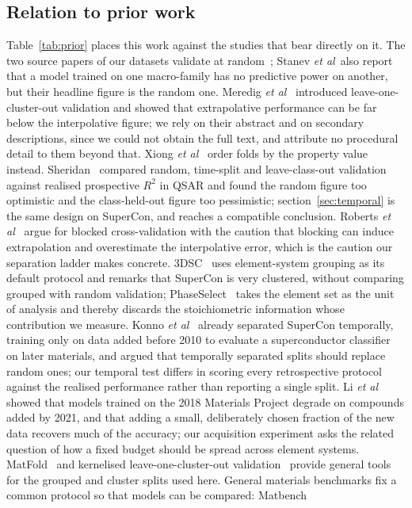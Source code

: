 \documentclass{iopjournal}
\newcommand{\Rsq}{R^{2}}
\newcommand{\etal}{\textit{et al}}
\begin{document}
\subsection{Relation to prior work}
\label{sec:prior}

Table~\ref{tab:prior} places this work against the studies that bear directly on it. The two source
papers of our datasets validate at random~\cite{hamidieh2018,stanev2018}; Stanev \etal\ also report
that a model trained on one macro-family has no predictive power on another, but their headline
figure is the random one. Meredig \etal~\cite{meredig2018} introduced leave-one-cluster-out
validation and showed that extrapolative performance can be far below the interpolative figure; we
rely on their abstract and on secondary descriptions, since we could not obtain the full text, and
attribute no procedural detail to them beyond that. Xiong \etal~\cite{xiong2020} order folds by
the property value instead. Sheridan~\cite{sheridan2013} compared random, time-split and
leave-class-out validation against realised prospective $\Rsq$ in QSAR and found the random figure
too optimistic and the class-held-out figure too pessimistic; section~\ref{sec:temporal} is the
same design on SuperCon, and reaches a compatible conclusion. Roberts \etal~\cite{roberts2017}
argue for blocked cross-validation with the caution that blocking can induce extrapolation and
overestimate the interpolative error, which is the caution our separation ladder makes concrete.
3DSC~\cite{sommer2023} uses element-system grouping as its default protocol and remarks that
SuperCon is very clustered, without comparing grouped with random validation;
PhaseSelect~\cite{vasylenko2023} takes the element set as the unit of analysis and thereby discards
the stoichiometric information whose contribution we measure. Konno \etal~\cite{konno2021} already separated SuperCon temporally, training only on data added before 2010 to evaluate a superconductor classifier on later materials, and argued that temporally separated splits should replace random ones; our temporal test differs in scoring every retrospective protocol against the realised performance rather than reporting a single split. Li \etal~\cite{li2023} showed that models trained on the 2018 Materials Project degrade on compounds added by 2021, and that adding a small, deliberately chosen fraction of the new data recovers much of the accuracy; our acquisition experiment asks the related question of how a fixed budget should be spread across element systems. MatFold~\cite{witman2025} and kernelised leave-one-cluster-out validation~\cite{durdy2022} provide general tools for the grouped and cluster splits used here. General materials benchmarks fix a common protocol so that models can be compared: Matbench
\end{document}
